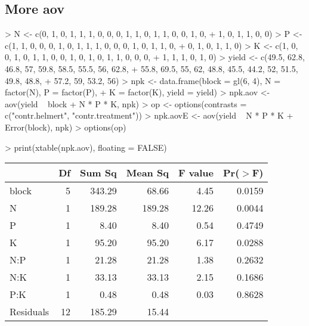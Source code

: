 \documentclass[letterpaper]{article}
\begin{document}
\subsection{More aov}
\begin{Schunk}
\begin{Sinput}
> N <- c(0, 1, 0, 1, 1, 1, 0, 0, 0, 1, 1, 0, 1, 1, 0, 0, 1, 0, 
+     1, 0, 1, 1, 0, 0)
> P <- c(1, 1, 0, 0, 0, 1, 0, 1, 1, 1, 0, 0, 0, 1, 0, 1, 1, 0, 
+     0, 1, 0, 1, 1, 0)
> K <- c(1, 0, 0, 1, 0, 1, 1, 0, 0, 1, 0, 1, 0, 1, 1, 0, 0, 0, 
+     1, 1, 1, 0, 1, 0)
> yield <- c(49.5, 62.8, 46.8, 57, 59.8, 58.5, 55.5, 56, 62.8, 
+     55.8, 69.5, 55, 62, 48.8, 45.5, 44.2, 52, 51.5, 49.8, 48.8, 
+     57.2, 59, 53.2, 56)
> npk <- data.frame(block = gl(6, 4), N = factor(N), P = factor(P), 
+     K = factor(K), yield = yield)
> npk.aov <- aov(yield ~ block + N * P * K, npk)
> op <- options(contrasts = c("contr.helmert", "contr.treatment"))
> npk.aovE <- aov(yield ~ N * P * K + Error(block), npk)
> options(op)
\end{Sinput}
\end{Schunk}
\begin{Schunk}
\begin{Sinput}
> print(xtable(npk.aov), floating = FALSE)
\end{Sinput}
% latex table generated in R 2.6.0 by xtable 1.5-2 package
% Wed Oct 10 14:26:36 2007
\begin{tabular}{lrrrrr}
  \hline
 & Df & Sum Sq & Mean Sq & F value & Pr($>$F) \\
  \hline
block & 5 & 343.29 & 68.66 & 4.45 & 0.0159 \\
  N & 1 & 189.28 & 189.28 & 12.26 & 0.0044 \\
  P & 1 & 8.40 & 8.40 & 0.54 & 0.4749 \\
  K & 1 & 95.20 & 95.20 & 6.17 & 0.0288 \\
  N:P & 1 & 21.28 & 21.28 & 1.38 & 0.2632 \\
  N:K & 1 & 33.13 & 33.13 & 2.15 & 0.1686 \\
  P:K & 1 & 0.48 & 0.48 & 0.03 & 0.8628 \\
  Residuals & 12 & 185.29 & 15.44 &  &  \\
   \hline
\end{tabular}\end{Schunk}
\end{document}
